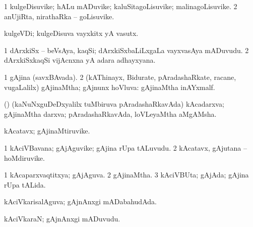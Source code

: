 {{{{{{{{{{{\bentry 
{} 
\gl{\nA}
\expl{}
\bmng
\bnum
\num{1} kulgeDisuvike; hALu mADuvike; kaluSitagoLisuvike; malinagoLisuvike. 
\num{2} anUjiRta, nirathaRka -- goLisuvike. 
\enum
\emng
\eentry

\bentry 
{} 
\gl{\nA}
\expl{}
\bmng
 kulgeVDi; kulgeDisuva vayxkitx yA vasutx. 
\emng
\eentry

\bentry 
{} 
\gl{\nA}
\expl{}
\bmng
\bnum
\num{1} dArxkiSx -- beVsAya, kaqSi; dArxkiSxbaLiLxgaLa vayxvasAya mADuvudu. 
\num{2} dArxkiSxkaqSi vijAcnxna yA adara adhayxyana. 
\enum
\emng
\eentry

\bentry
{} 
\gl{\gu}
\expl{}
\bmng
\bnum
\num{1} gAjina (savxBAvada). 
\num{2} (kAThinayx, Bidurate, pAradashaRkate, racane, \mo vugaLalilx) gAjinaMtha; gAjnunx hoVluva:  gAjinaMtha inAYxmalf. 
\enum
\emng
\eentry

\bentry
{}
\gl{\nA}
\expl{}
\bmng
 (\aMrashA) (kaNuNxguDeDxyalilx tuMbiruva pAradashaRkavAda) kAcadarxva; gAjinaMtha darxva; pAradashaRkavAda, loVLeyaMtha aMgAMsha. 
\emng
\eentry

\bentry 
{}
\gl{\nA}
\expl{}
\bmng
\emng
\eentry

\bentry
{} 
\gl{\nA}
\expl{}
\bmng
 kAcatavx; gAjinaMtiruvike. 
\emng
\eentry

\bentry
{} 
\gl{\nA}
\expl{}
\bmng
\bnum
\num{1} kAciVBavana; gAjAguvike; gAjina rUpa tALuvudu. 
\num{2} kAcatavx, gAjutana -- hoMdiruvike. 
\enum
\emng
\eentry

\bentry 
{} 
\gl{\gu}
\expl{}
\bmng
\bnum
\num{1} kAcaparxvaqtitxya; gAjAguva. 
\num{2} gAjinaMtha. 
\num{3} kAciVBUta; gAjAda; gAjina rUpa tALida. 
\enum
\emng
\eentry

\bentry 
{} 
\gl{\nA}
\expl{}
\bmng
\emng
\eentry

\bentry
{} 
\gl{\gu}
\expl{}
\bmng
 kAciVkarisalAguva; gAjnAnxgi mADabahudAda. 
\emng
\eentry

\bentry 
{} 
\gl{\nA}
\expl{}
\bmng
 kAciVkaraN; gAjnAnxgi mADuvudu. 
\emng
\eentry

}}}}}}}}}}}
